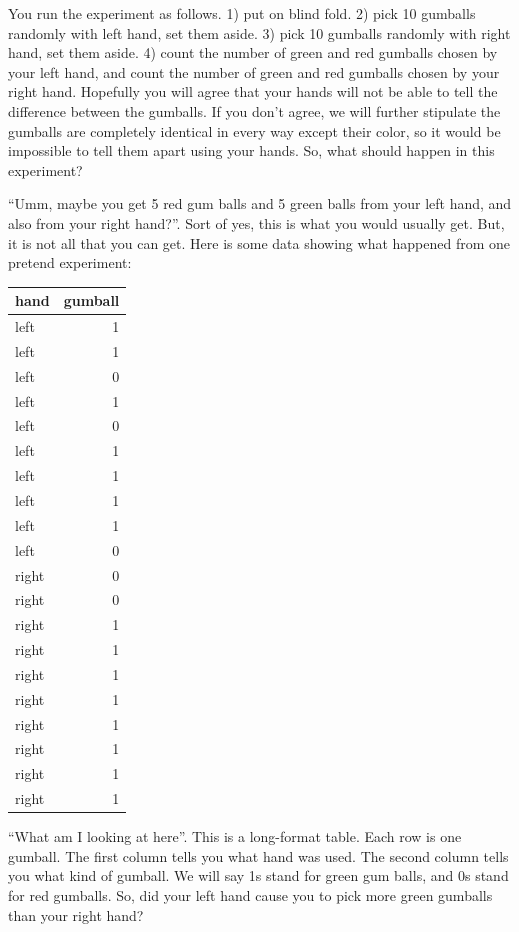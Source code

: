\documentclass[
  letterpaper,
  DIV=11,
  numbers=noendperiod]{scrreprt}
\begin{document}
You run the experiment as follows. 1) put on blind fold. 2) pick 10
gumballs randomly with left hand, set them aside. 3) pick 10 gumballs
randomly with right hand, set them aside. 4) count the number of green
and red gumballs chosen by your left hand, and count the number of green
and red gumballs chosen by your right hand. Hopefully you will agree
that your hands will not be able to tell the difference between the
gumballs. If you don't agree, we will further stipulate the gumballs are
completely identical in every way except their color, so it would be
impossible to tell them apart using your hands. So, what should happen
in this experiment?

``Umm, maybe you get 5 red gum balls and 5 green balls from your left
hand, and also from your right hand?''. Sort of yes, this is what you
would usually get. But, it is not all that you can get. Here is some
data showing what happened from one pretend experiment:

\begin{longtable}[]{@{}lr@{}}
\toprule\noalign{}
hand & gumball \\
\midrule\noalign{}
\endhead
\bottomrule\noalign{}
\endlastfoot
left & 1 \\
left & 1 \\
left & 0 \\
left & 1 \\
left & 0 \\
left & 1 \\
left & 1 \\
left & 1 \\
left & 1 \\
left & 0 \\
right & 0 \\
right & 0 \\
right & 1 \\
right & 1 \\
right & 1 \\
right & 1 \\
right & 1 \\
right & 1 \\
right & 1 \\
right & 1 \\
\end{longtable}

``What am I looking at here''. This is a long-format table. Each row is
one gumball. The first column tells you what hand was used. The second
column tells you what kind of gumball. We will say 1s stand for green
gum balls, and 0s stand for red gumballs. So, did your left hand cause
you to pick more green gumballs than your right hand?
\end{document}
